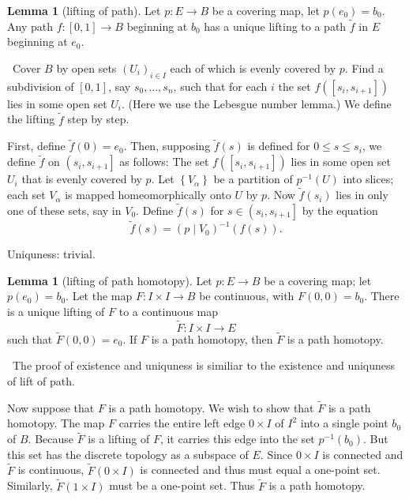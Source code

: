 \documentclass[12pt,a4paper]{book}
\newenvironment{prooff}{{\noindent\it\textcolor{cyan!40!black}{Proof}:}\,}{\par}
\theoremstyle{definition}
\newtheorem{lem}[defn]{Lemma}
\begin{document}
\begin{lem}[lifting of path]
    Let $p: E \rightarrow B$ be a covering map, let $p\left(e_0\right)=b_0$. Any path $f:[0,1] \rightarrow B$ beginning at $b_0$ has a unique lifting to a path $\tilde{f}$ in $E$ beginning at $e_0$.
    \label{lemma:lift of path}
\end{lem}
\begin{prooff}
    Cover $B$ by open sets $(U_i)_{i\in I}$ each of which is evenly covered by $p$. Find a subdivision of $[0,1]$, say $s_0, \ldots, s_n$, such that for each $i$ the set $f\left(\left[s_i, s_{i+1}\right]\right)$ lies in some open set $U_i$. (Here we use the Lebesgue number lemma.) We define the lifting $\tilde{f}$ step by step.

    First, define $\tilde{f}(0)=e_0$. Then, supposing $\tilde{f}(s)$ is defined for $0 \leq s \leq s_i$, we define $\tilde{f}$ on $\left(s_i, s_{i+1}\right]$ as follows: The set $f\left(\left[s_i, s_{i+1}\right]\right)$ lies in some open set $U_i$ that is evenly covered by $p$. Let $\left\{V_\alpha\right\}$ be a partition of $p^{-1}(U)$ into slices; each set $V_\alpha$ is mapped homeomorphically onto $U$ by $p$. Now $\tilde{f}\left(s_i\right)$ lies in only one of these sets, say in $V_0$. Define $\tilde{f}(s)$ for $s \in\left(s_i, s_{i+1}\right]$ by the equation
    $$
        \tilde{f}(s)=\left(p \mid V_0\right)^{-1}(f(s)) .
    $$

    Uniquness: trivial.
\end{prooff}
\begin{lem}[lifting of path homotopy]
    Let $p: E \rightarrow B$ be a covering map; let $p\left(e_0\right)=b_0$. Let the map $F: I \times I \rightarrow B$ be continuous, with $F(0,0)=b_0$. There is a unique lifting of $F$ to a continuous map
    $$
        \tilde{F}: I \times I \rightarrow E
    $$
    such that $\tilde{F}(0,0)=e_0$. If $F$ is a path homotopy, then $\tilde{F}$ is a path homotopy.
    \label{lemma:lift of path homotopy}
\end{lem}
\begin{prooff}
    The proof of existence and uniquness is similiar to the existence and uniquness of lift of path.

    Now suppose that $F$ is a path homotopy. We wish to show that $\tilde{F}$ is a path homotopy. The map $F$ carries the entire left edge $0 \times I$ of $I^2$ into a single point $b_0$ of $B$. Because $\tilde{F}$ is a lifting of $F$, it carries this edge into the set $p^{-1}\left(b_0\right)$. But this set has the discrete topology as a subspace of $E$. Since $0 \times I$ is connected and $\tilde{F}$ is continuous, $\tilde{F}(0 \times I)$ is connected and thus must equal a one-point set. Similarly, $\tilde{F}(1 \times I)$ must be a one-point set. Thus $\tilde{F}$ is a path homotopy.

\end{prooff}
\end{document}
